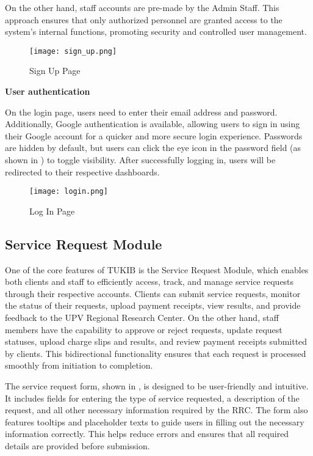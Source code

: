 On the other hand, staff accounts are pre-made by the Admin Staff. This approach ensures that only authorized personnel are granted access to the system’s internal functions, promoting security and controlled user management.

\newpage

\begin{figure}[h]
	\centering 
	\texttt{[image: sign\_up.png]}
	\caption{Sign Up Page}
	\label{fig:signup_page}
\end{figure}

\textbf{User authentication}

On the login page, users need to enter their email address and password. Additionally, Google authentication is available, allowing users to sign in using their Google account for a quicker and more secure login experience. Passwords are hidden by default, but users can click the eye icon in the password field (as shown in ) to toggle visibility. After successfully logging in, users will be redirected to their respective dashboards.

\begin{figure}[h]
	\centering 
	\texttt{[image: login.png]}
	\caption{Log In Page}
	\label{fig:login}
\end{figure}

\subsection{Service Request Module}

One of the core features of TUKIB is the Service Request Module, which enables both clients and staff to efficiently access, track, and manage service requests through their respective accounts. Clients can submit service requests, monitor the status of their requests, upload payment receipts, view results, and provide feedback to the UPV Regional Research Center. On the other hand, staff members have the capability to approve or reject requests, update request statuses, upload charge slips and results, and review payment receipts submitted by clients. This bidirectional functionality ensures that each request is processed smoothly from initiation to completion.

The service request form, shown in , is designed to be user-friendly and intuitive. It includes fields for entering the type of service requested, a description of the request, and all other necessary information required by the RRC. The form also features tooltips and placeholder texts to guide users in filling out the necessary information correctly. This helps reduce errors and ensures that all required details are provided before submission.

